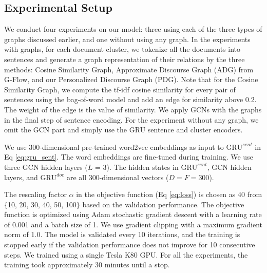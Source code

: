 \documentclass[11pt,a4paper]{article}
\begin{document}
\subsection{Experimental Setup}
We conduct four experiments on our model: three using each of the three types of graphs discussed earlier, and one without using any graph. 
In the experiments with graphs, for each document cluster, we tokenize all the documents into sentences and 
generate a graph representation of their relations by the three methods: Cosine Similarity Graph, Approximate Discourse Graph (ADG) from G-Flow, and our Personalized Discourse Graph (PDG). 
Note that for the Cosine Similarity Graph, we compute the tf-idf cosine similarity for every pair of sentences using the bag-of-word model and add an edge for similarity above 0.2. The weight of the edge is the value of similarity.
We apply GCNs with the graphs in the final step of sentence encoding.
For the experiment without any graph, we omit the GCN part and simply use the GRU sentence and cluster encoders.

We use 300-dimensional pre-trained word2vec embeddings \cite{mikolov2013distributed} as input to $\mathrm{GRU}^{sent}$ in Eq \ref{eq:gru_sent}.
The word embeddings are fine-tuned during training.
We use three GCN hidden layers ($L$ = 3).
The hidden states in $\mathrm{GRU}^{sent}$, GCN hidden layers, and $\mathrm{GRU}^{doc}$ are all 300-dimensional vectors ($D=F=300$).

The rescaling factor $\alpha$ in the objective function (Eq \ref{eq:loss}) is chosen as 40 from $\{$10, 20, 30, 40, 50, 100$\}$ based on the validation performance.
The objective function is optimized using Adam \cite{kingma2015adam} stochastic gradient descent with a learning rate of 0.001 and a batch size of 1.
We use gradient clipping with a maximum gradient norm of 1.0.
The model is validated every 10 iterations, and
the training is stopped early if the validation performance does not improve for 10 consecutive steps.
We trained using a single Tesla K80 GPU. 
For all the experiments, the training took approximately 30 minutes until a stop.
\end{document}
